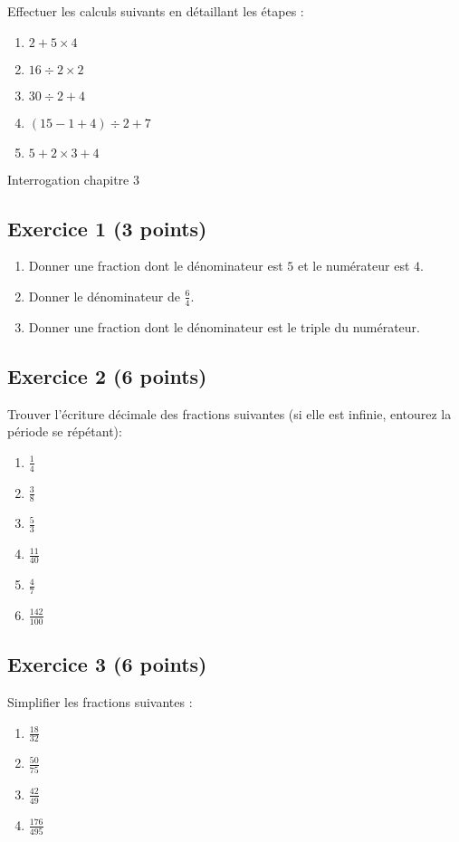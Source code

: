 \documentclass[14 pt]{extarticle}
\theoremstyle{plain}
\begin{document}
 Effectuer les calculs suivants en détaillant les étapes : 
 \begin{enumerate}
 \item $2 + 5 \times 4$
 \item $ 16 \div 2 \times 2$
 \item $ 30 \div 2 + 4$
 \item $ (15 - 1 + 4) \div 2 + 7$
 \item $ 5 + 2 \times 3 + 4$
 \end{enumerate} 
 
\newpage 

\begin{center}{\Large Interrogation chapitre 3}\\ 
 \end{center}
 \subsection*{Exercice 1 (3 points)}
 
 \begin{enumerate}
 \item Donner une fraction dont le dénominateur est $5$ et le numérateur est $4$. 
 \item Donner le dénominateur de $\frac64$.
 \item Donner une fraction dont le dénominateur est le triple du numérateur. 
 \end{enumerate}
 
 \subsection*{Exercice 2 (6 points)}
Trouver l'écriture décimale des fractions suivantes (si elle est infinie, entourez la période se répétant): 
\begin{enumerate}
\item $\frac14$
\item $\frac38$
\item $\frac53$
\item $\frac{11}{40}$ 
\item $\frac47$
\item $\frac{142}{100}$
\end{enumerate}
 \subsection*{Exercice 3 (6 points)}
 
 Simplifier les fractions suivantes : 
 \begin{enumerate}
 \item $\frac{18}{32}$ 
 \item $\frac{50}{75}$
 \item $\frac{42}{49}$
 \item $\frac{176}{495}$
 \end{enumerate}
 
\end{document}
